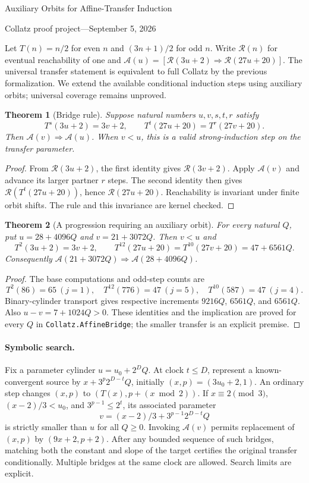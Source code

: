 \documentclass[10pt]{article}
\newtheorem{theorem}{Theorem}
\newcommand{\R}{\mathcal R}
\newcommand{\A}{\mathcal A}
\begin{document}
\begin{center}
{\Large Auxiliary Orbits for Affine-Transfer Induction}\par\medskip
Collatz proof project\quad---\quad September 5, 2026
\end{center}
Let $T(n)=n/2$ for even $n$ and $(3n+1)/2$ for odd $n$.
Write $\R(n)$ for eventual reachability of one and
$\A(u)=[\R(3u+2)\Rightarrow\R(27u+20)]$.
The universal transfer statement is equivalent to full Collatz by the
previous formalization. We extend the available conditional induction
steps using auxiliary orbits; universal coverage remains unproved.

\begin{theorem}[Bridge rule]
Suppose natural numbers $u,v,s,t,r$ satisfy
\[
 T^s(3u+2)=3v+2,\qquad T^t(27u+20)=T^r(27v+20).
\]
Then $\A(v)\Rightarrow\A(u)$. When $v<u$, this is a valid
strong-induction step on the transfer parameter.
\end{theorem}
\begin{proof}
From $\R(3u+2)$, the first identity gives $\R(3v+2)$.
Apply $\A(v)$ and advance its larger partner $r$ steps.
The second identity then gives $\R(T^t(27u+20))$, hence
$\R(27u+20)$. Reachability is invariant under finite orbit shifts.
The rule and this invariance are kernel checked.
\end{proof}

\begin{theorem}[A progression requiring an auxiliary orbit]
For every natural $Q$, put $u=28+4096Q$ and $v=21+3072Q$.
Then $v<u$ and
\[
 T^2(3u+2)=3v+2,\qquad
 T^{12}(27u+20)=T^{10}(27v+20)=47+6561Q.
\]
Consequently $\A(21+3072Q)\Rightarrow\A(28+4096Q)$.
\end{theorem}
\begin{proof}
The base computations and odd-step counts are
\[
 T^2(86)=65\ (j=1),\quad T^{12}(776)=47\ (j=5),\quad
 T^{10}(587)=47\ (j=4).
\]
Binary-cylinder transport gives respective increments $9216Q$,
$6561Q$, and $6561Q$. Also $u-v=7+1024Q>0$.
These identities and the implication are proved for every $Q$ in
\texttt{Collatz.AffineBridge}; the smaller transfer is an explicit premise.
\end{proof}

\paragraph{Symbolic search.}
Fix a parameter cylinder $u=u_0+2^D Q$.
At clock $t\leq D$, represent a known-convergent source by
$x+3^p2^{D-t}Q$, initially $(x,p)=(3u_0+2,1)$.
An ordinary step changes $(x,p)$ to $(T(x),p+(x\bmod2))$.
If $x\equiv2\pmod3$, $(x-2)/3<u_0$, and $3^{p-1}\leq2^t$,
its associated parameter
\[
 v=(x-2)/3+3^{p-1}2^{D-t}Q
\]
is strictly smaller than $u$ for all $Q\geq0$.
Invoking $\A(v)$ permits replacement of $(x,p)$ by $(9x+2,p+2)$.
After any bounded sequence of such bridges, matching both the constant
and slope of the target certifies the original transfer conditionally.
Multiple bridges at the same clock are allowed. Search limits are explicit.
\end{document}
